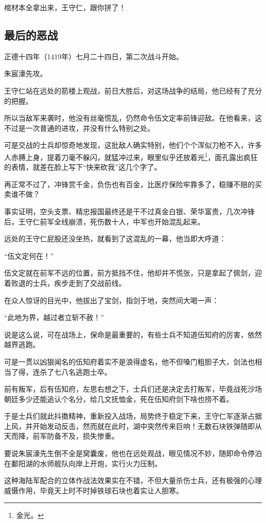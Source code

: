 \begin{multicols}{\theparacolNo}
棺材本全拿出来，王守仁，跟你拼了！

\subsection{最后的恶战}
正德十四年（1419年）七月二十四日，第二次战斗开始。

朱宸濠先攻。

王守仁站在远处的箭楼上观战，前日大胜后，对这场战争的结局，他已经有了充分的把握。

所以当敌军来袭时，他没有丝毫慌乱，仍然命令伍文定率前锋迎敌。在他看来，这不过是一次普通的进攻，并没有什么特别之处。

可是交战的士兵却惊奇地发现，这批敌人确实特别，他们个个浑似刀枪不入，许多人赤膊上身，提着刀毫不躲闪，就猛冲过来，眼里似乎还放着光\footnote{金光。}，面孔露出疯狂的表情，就差在脸上写下“快来砍我”这几个字了。

再正常不过了，冲锋赏千金，负伤也有百金，比医疗保险牢靠多了，稳赚不赔的买卖谁不做？

事实证明，空头支票、精忠报国最终还是干不过真金白银、荣华富贵，几次冲锋后，王守仁前军全线崩溃，死伤数十人，中军也开始混乱起来。

远处的王守仁屁股还没坐热，就看到了这混乱的一幕，他当即大呼道：

“伍文定何在！”

伍文定就在前军不远的位置，前方抵挡不住，他却并不慌张，只是拿起了佩剑，迎着败退的士兵，疾步走到了交战前线。

在众人惊讶的目光中，他拔出了宝剑，指剑于地，突然间大喝一声：

“此地为界，越过者立斩不赦！”

说是这么说，可在战场上，保命是最重要的，有些士兵不知道伍知府的厉害，依然越界逃跑。

可是一贯以凶狠闻名的伍知府着实不是浪得虚名，他不但嗓门粗胆子大，剑法也相当了得，连杀了七八名逃跑士卒。

前有叛军，后有伍知府，左思右想之下，士兵们还是决定去打叛军，毕竟战死沙场朝廷多少还能追认个名分，给几文抚恤金，死在伍知府剑下啥也捞不着。

于是士兵们就此抖擞精神，重新投入战场，局势终于稳定下来，王守仁军逐渐占据上风，并开始发动反击，然而就在此时，湖中突然传来巨响！无数石块铁弹随即从天而降，前军防备不及，损失惨重。

要说朱宸濠先生倒不全是窝囊废，他也在远处观战，眼见情况不妙，随即命令停泊在鄱阳湖的水师舰队向岸上开炮，实行火力压制。

这种海陆军配合的立体作战法效果实在不错，不但大量杀伤士兵，还有极强的心理威慑作用，毕竟天上时不时掉铁球石块也着实让人胆寒。


\end{multicols}
